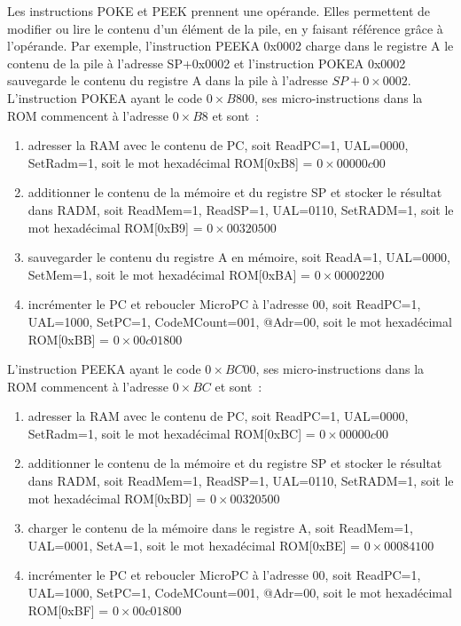 Les instructions POKE et PEEK prennent une opérande. Elles permettent de modifier ou lire le contenu d'un élément de la pile, en y faisant référence grâce à l'opérande. Par exemple, l'instruction PEEKA 0x0002 charge dans le registre A le contenu de la pile à l'adresse SP+0x0002 et l'instruction POKEA 0x0002 sauvegarde le contenu du registre A dans la pile à l'adresse $SP + 0\times0002$. L'instruction POKEA ayant le code $0\times B800$, ses micro-instructions dans la ROM commencent à l'adresse $0\times B8$ et sont~:
\begin{enumerate}
\item adresser la RAM avec le contenu de PC, soit ReadPC=1, UAL=0000, SetRadm=1, soit le mot hexadécimal ROM[0xB8] = $0\times00000c00$
\item additionner le contenu de la mémoire et du registre SP et stocker le résultat dans RADM, soit ReadMem=1, ReadSP=1, UAL=0110, SetRADM=1, soit le mot hexadécimal ROM[0xB9] = $0\times00320500$
\item sauvegarder le contenu du registre A en mémoire, soit ReadA=1, UAL=0000, SetMem=1, soit le mot hexadécimal ROM[0xBA] = $0\times00002200$
\item incrémenter le PC et reboucler MicroPC à l'adresse 00, soit ReadPC=1, UAL=1000, SetPC=1, CodeMCount=001, @Adr=00, soit le mot hexadécimal ROM[0xBB] = $0\times00c01800$
\end{enumerate}
L'instruction PEEKA ayant le code $0\times BC00$, ses micro-instructions dans la ROM commencent à l'adresse $0\times BC$ et sont~:
\begin{enumerate}
\item adresser la RAM avec le contenu de PC, soit ReadPC=1, UAL=0000, SetRadm=1, soit le mot hexadécimal ROM[0xBC] = $0\times00000c00$
\item additionner le contenu de la mémoire et du registre SP et stocker le résultat dans RADM, soit ReadMem=1, ReadSP=1, UAL=0110, SetRADM=1, soit le mot hexadécimal ROM[0xBD] = $0\times00320500$
\item charger le contenu de la mémoire dans le registre A, soit ReadMem=1, UAL=0001, SetA=1, soit le mot hexadécimal ROM[0xBE] = $0\times00084100$
\item incrémenter le PC et reboucler MicroPC à l'adresse 00, soit ReadPC=1, UAL=1000, SetPC=1, CodeMCount=001, @Adr=00, soit le mot hexadécimal ROM[0xBF] = $0\times00c01800$
\end{enumerate}





